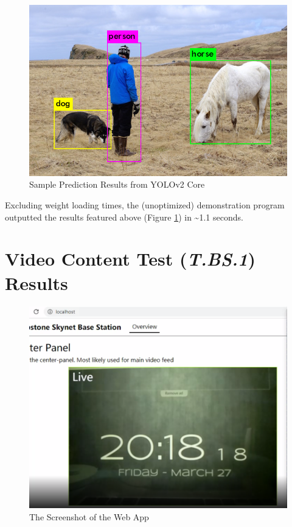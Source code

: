 \documentclass[10pt,letterpaper]{article}
\begin{document}
\begin{figure}[H]
\centering
\includegraphics[width=12.5cm]{img/pred.png}
\caption{Sample Prediction Results from YOLOv2 Core}
\label{ml_demo}
\end{figure} 
 
Excluding weight loading times, the (unoptimized) demonstration program outputted the results featured above (Figure \ref{ml_demo}) in \textasciitilde 1.1 seconds.

\section{Video Content Test (\textit{T.BS.1}) Results}\label{appendix:T.BS.1}

\begin{figure}[H]
\centering
\includegraphics[width=12.5cm]{img/t.bs.1.png}
\caption{The Screenshot of the Web App}
\label{video_test}
\end{figure} 
\end{document}
